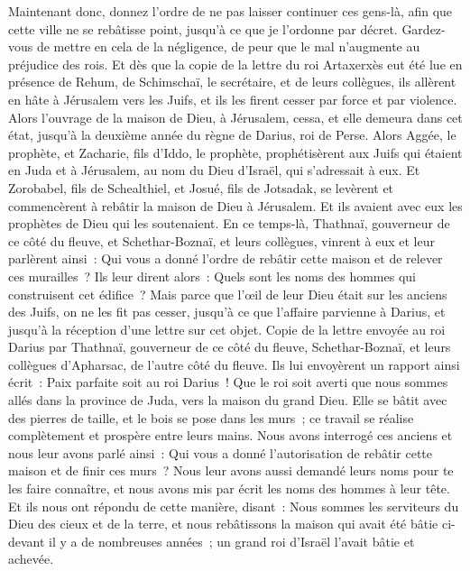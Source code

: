 \begin{multicols}{2}
Maintenant donc, donnez l'ordre de ne pas laisser continuer ces gens-là, afin que cette ville ne se rebâtisse point, jusqu'à ce que je l'ordonne par décret.
Gardez-vous de mettre en cela de la négligence, de peur que le mal n'augmente au préjudice des rois.
Et dès que la copie de la lettre du roi Artaxerxès eut été lue en présence de Rehum, de Schimschaï, le secrétaire, et de leurs collègues, ils allèrent en hâte à Jérusalem vers les Juifs, et ils les firent cesser par force et par violence.
Alors l'ouvrage de la maison de Dieu, à Jérusalem, cessa, et elle demeura dans cet état, jusqu'à la deuxième année du règne de Darius, roi de Perse.
\VerseOne{}Alors Aggée, le prophète, et Zacharie, fils d'Iddo, le prophète, prophétisèrent aux Juifs qui étaient en Juda et à Jérusalem, au nom du Dieu d'Israël, qui s'adressait à eux.
Et Zorobabel, fils de Schealthiel, et Josué, fils de Jotsadak, se levèrent et commencèrent à rebâtir la maison de Dieu à Jérusalem. Et ils avaient avec eux les prophètes de Dieu qui les soutenaient.
En ce temps-là, Thathnaï, gouverneur de ce côté du fleuve, et Schethar-Boznaï, et leurs collègues, vinrent à eux et leur parlèrent ainsi~: Qui vous a donné l'ordre de rebâtir cette maison et de relever ces murailles~?
Ils leur dirent alors~: Quels sont les noms des hommes qui construisent cet édifice~?
Mais parce que l'œil de leur Dieu était sur les anciens des Juifs, on ne les fit pas cesser, jusqu'à ce que l'affaire parvienne à Darius, et jusqu'à la réception d'une lettre sur cet objet.
Copie de la lettre envoyée au roi Darius par Thathnaï, gouverneur de ce côté du fleuve, Schethar-Boznaï, et leurs collègues d'Apharsac, de l'autre côté du fleuve.
Ils lui envoyèrent un rapport ainsi écrit~: Paix parfaite soit au roi Darius~!
Que le roi soit averti que nous sommes allés dans la province de Juda, vers la maison du grand Dieu. Elle se bâtit avec des pierres de taille, et le bois se pose dans les murs~; ce travail se réalise complètement et prospère entre leurs mains.
Nous avons interrogé ces anciens et nous leur avons parlé ainsi~: Qui vous a donné l'autorisation de rebâtir cette maison et de finir ces murs~?
Nous leur avons aussi demandé leurs noms pour te les faire connaître, et nous avons mis par écrit les noms des hommes à leur tête.
Et ils nous ont répondu de cette manière, disant~: Nous sommes les serviteurs du Dieu des cieux et de la terre, et nous rebâtissons la maison qui avait été bâtie ci-devant il y a de nombreuses années~; un grand roi d'Israël l'avait bâtie et achevée.

\end{multicols}

